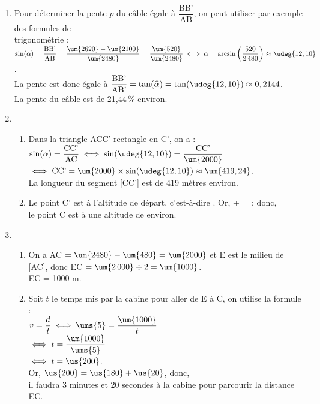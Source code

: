 \ \\ [-5mm]
   \begin{enumerate}
      \item Pour déterminer la pente $p$ du câble égale à $\dfrac{\text{BB'}}{\text{AB}}$, on peut utiliser par exemple des formules de \\ [1mm]
         trigonométrie : $\sin(\alpha) =\dfrac{\text{BB'}}{\text{AB}} =\dfrac{\um{2620}-\um{2100}}{\um{2480}} =\dfrac{\um{520}}{\um{2480}} \iff \alpha =\arcsin\left(\dfrac{520}{2\,480}\right) \approx\udeg{12,10}$. \\ [1mm]
         La pente est donc égale à $\dfrac{\text{BB'}}{\text{AB'}} =\tan(\widehat{\alpha}) =\tan(\udeg{12,10}) \approx0,2144$. \\ [1mm]
         {\blue La pente du câble est de 21,44\,\% environ}.
      \item
      \begin{enumerate}
         \item Dans la triangle ACC' rectangle en C', on a : $\sin(\alpha) =\dfrac{\text{CC'}}{\text{AC}} \iff \sin(\udeg{12,10}) =\dfrac{\text{CC'}}{\um{2000}}$ \\ [1mm]
         $\iff \text{CC'} =\um{2000}\times\sin(\udeg{12,10}) \approx\um{419,24}$. \\
         {\blue La longueur du segment [CC'] est de 419 mètres environ}.
         \item Le point C' est à l'altitude de départ, c'est-à-dire . Or,  +  =  ; donc, \\
         {\blue le point C est à une altitude de  environ.}
      \end{enumerate}
      \setcounter{enumi}{2}
      \item
      \begin{enumerate}
         \item On a AC $=\um{2480}-\um{480} =\um{2000}$ et E est le milieu de [AC], donc EC $=\um{2\,000}\div2 =\um{1000}$. \\
         {\blue EC = 1000 m.}
         \item Soit $t$ le temps mis par la cabine pour aller de E à C, on utilise la formule : \\ [1mm]
         $v =\dfrac{d}{t} \iff \ums{5} =\dfrac{\um{1000}}{t}$ \\
         \hspace*{0.9cm} $\iff t = \dfrac{\um{1000}}{\ums{5}}$ \\ [1.5mm]
         \hspace*{0.9cm} $\iff t  =\us{200}$. \\
         Or, $\us{200} =\us{180}+\us{20}$, donc, \\
         {\blue il faudra 3 minutes et 20 secondes à la cabine pour parcourir la distance EC}.
      \end{enumerate}
   \end{enumerate}
